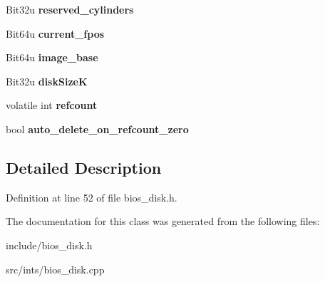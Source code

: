 \begin{DoxyCompactItemize}
\item 
\hypertarget{classimageDisk_a6588490a427230feac862942f34e401b}{Bit32u {\bfseries reserved\-\_\-cylinders}}\label{classimageDisk_a6588490a427230feac862942f34e401b}

\item 
\hypertarget{classimageDisk_afee451f676f8572279bc2354cead2bd9}{Bit64u {\bfseries current\-\_\-fpos}}\label{classimageDisk_afee451f676f8572279bc2354cead2bd9}

\item 
\hypertarget{classimageDisk_aa12b7c8c8b8bc9745dd93a10d13d89b9}{Bit64u {\bfseries image\-\_\-base}}\label{classimageDisk_aa12b7c8c8b8bc9745dd93a10d13d89b9}

\item 
\hypertarget{classimageDisk_a3a3603c680c9bbcf8206b13cf6d0f335}{Bit32u {\bfseries disk\-Size\-K}}\label{classimageDisk_a3a3603c680c9bbcf8206b13cf6d0f335}

\item 
\hypertarget{classimageDisk_a81222a3e8c9252b1737d13be03ca6bed}{volatile int {\bfseries refcount}}\label{classimageDisk_a81222a3e8c9252b1737d13be03ca6bed}

\item 
\hypertarget{classimageDisk_a94ba3581ff2159062036f478c41f889e}{bool {\bfseries auto\-\_\-delete\-\_\-on\-\_\-refcount\-\_\-zero}}\label{classimageDisk_a94ba3581ff2159062036f478c41f889e}

\end{DoxyCompactItemize}


\subsection{Detailed Description}


Definition at line 52 of file bios\-\_\-disk.\-h.



The documentation for this class was generated from the following files\-:\begin{DoxyCompactItemize}
\item 
include/bios\-\_\-disk.\-h\item 
src/ints/bios\-\_\-disk.\-cpp\end{DoxyCompactItemize}
